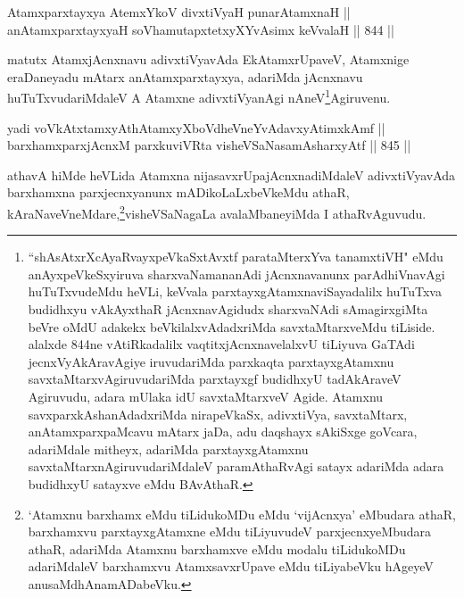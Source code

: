 \begin{shl}
Atamxparxtayxya AtemxYkoV divxtiVyaH punarAtamxnaH || \\
anAtamxparxtayxyaH soV\s hamutapxtetxyXYvAsimx keVvalaH \hfill || 844 ||  
\end{shl}

\begin{artha}
matutx AtamxjAcnxnavu adivxtiVyavAda EkAtamxrUpaveV, Atamxnige eraDaneyadu mAtarx anAtamxparxtayxya, adariMda jAcnxnavu huTuTxvudariMdaleV A Atamxne adivxtiVyanAgi nAneV\footnote{``shAsAtxrXcAyaRvayxpeVkaSxtAvxtf parataMterxYva tanamxtiVH" eMdu anAyxpeVkeSxyiruva sharxvaNamananAdi jAcnxnavanunx parAdhiVnavAgi huTuTxvudeMdu heVLi, keVvala parxtayxgAtamxnaviSayadalilx huTuTxva budidhxyu vAkAyxthaR jAcnxnavAgidudx sharxvaNAdi sAmagirxgiMta beVre oMdU adakekx beVkilalxvAdadxriMda savxtaMtarxveMdu tiLiside. alalxde 844ne vAtiRkadalilx vaqtitxjAcnxnavelalxvU tiLiyuva GaTAdi jecnxVyAkAravAgiye iruvudariMda parxkaqta parxtayxgAtamxnu savxtaMtarxvAgiruvudariMda parxtayxgf budidhxyU tadAkAraveV Agiruvudu, adara mUlaka idU savxtaMtarxveV Agide. Atamxnu savxparxkAshanAdadxriMda nirapeVkaSx, adivxtiVya, savxtaMtarx, anAtamxparxpaMcavu mAtarx jaDa, adu daqshayx sAkiSxge goVcara, adariMdale mitheyx, adariMda parxtayxgAtamxnu savxtaMtarxnAgiruvudariMdaleV paramAthaRvAgi satayx adariMda adara budidhxyU satayxve eMdu BAvAthaR.}Agiruvenu.
\end{artha}



\begin{shl}
yadi voVkAtxtamxyAthAtamxyXboVdheVneYvAdavxyAtimxkAmf || \\
barxhamxparxjAcnxM parxkuviVRta visheVSaNasamAsharxyAtf \hfill || 845 ||  
\end{shl}

\begin{artha}
athavA hiMde heVLida Atamxna nijasavxrUpajAcnxnadiMdaleV adivxtiVyavAda barxhamxna parxjecnxyanunx mADikoLaLxbeVkeMdu athaR, kAraNaveVneMdare,\footnote{`Atamxnu barxhamx eMdu tiLidukoMDu eMdu `vijAcnxya' eMbudara athaR, barxhamxvu parxtayxgAtamxne eMdu tiLiyuvudeV parxjecnxyeMbudara athaR, adariMda Atamxnu barxhamxve eMdu modalu tiLidukoMDu adariMdaleV barxhamxvu AtamxsavxrUpave eMdu tiLiyabeVku hAgeyeV anusaMdhAnamADabeVku.}visheVSaNagaLa avalaMbaneyiMda I athaRvAguvudu.
\end{artha}

